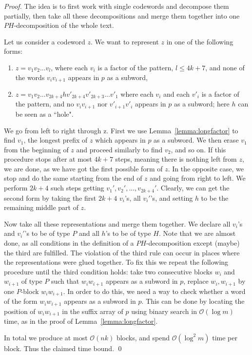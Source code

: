 \documentclass[runningheads]{llncs}
\begin{document}
\begin{proof}
The idea is to first work with single codewords and decompose them partially, then take all these decompositions and merge them together into one $PH$-decomposition of the whole text.

Let us consider a codeword $z$. We want to represent $z$ in one of the following forms:
\begin{enumerate}
\item $z=v_1v_2...v_l$, where each $v_i$ is a factor of the pattern, $l\leq 4k+7$, and none of the words $v_iv_{i+1}$ appears in $p$ as a subword,
\item $z=v_1v_2...v_{2k+4}hv'_{2k+4}v'_{2k+3}...v'_{1}$ where each $v_i$ and each $v'_i$ is a factor of the pattern, and no $v_iv_{i+1}$ nor $v'_{i+1}v'_{i}$ appears in $p$ as a subword; here $h$ can be seen as a ``hole".
\end{enumerate}
We go from left to right through z. First we use Lemma~\ref{lemma:longfactor} to find $v_1$, the longest prefix of $z$ which appears in $p$ as a subword. We then erase $v_1$ from the beginning of $z$ and proceed similarly to find $v_2$, and so on. If this procedure stops after at most $4k+7$ steps, meaning there is nothing left from $z$, we are done, as we have got the first possible form of $z$. In the opposite case, we stop and do the same starting from the end of $z$ and going from right to left. We perform $2k+4$ such steps getting $v_1', v_2', ..., v_{2k+4}'$. Clearly, we can get the second form by taking the first $2k+4$ $v_i$'s, all $v_i'$'s, and setting $h$ to be the remaining middle part of $z$.

Now take all these representations and merge them together. We declare all $v_i$'s and $v_i'$'s to be of type $P$ and all $h$'s to be of type $H$. Note that we are almost done, as all conditions in the definition of a $PH$-decomposition except (maybe) the third are fulfilled. The violation of the third rule can occur in places where the representations were glued together. To fix this we repeat the following procedure until the third condition holds: take two consecutive blocks $w_i$ and $w_{i+1}$ of type $P$ such that $w_iw_{i+1}$ appears as a subword in $p$, replace $w_i, w_{i+1}$ by one $P$-block $w_iw_{i+1}$. In order to do this, we need a way to check whether a word of the form $w_iw_{i+1}$ appears as a subword in $p$. This can be done by locating the position of $w_{i}w_{i+1}$ in the suffix array of $p$ using binary search in $\mathcal{O}(\log m)$ time, as in the proof of Lemma~\ref{lemma:longfactor}.

In total we produce at most $\mathcal{O}(nk)$ blocks, and spend $\mathcal{O}(\log^2m)$ time per block. Thus the claimed time bound.
\qed
\end{proof}
\end{document}
